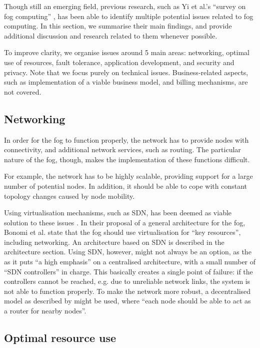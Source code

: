 \documentclass{article}
\begin{document}
Though still an emerging field, previous research, such as Yi et al.'s ``survey on fog computing'' \cite{yi2015survey}, has been able to identify multiple potential issues related to fog computing. In this section, we summarise their main findings, and provide additional discussion and research related to them whenever possible.

To improve clarity, we organise issues around 5 main areas: networking, optimal use of resources, fault tolerance, application development, and security and privacy. Note that we focus purely on technical issues. Business-related aspects, such as implementation of a viable business model, and billing mechanisms, are not covered.

\subsection{Networking}
In order for the fog to function properly, the network has to provide nodes with connectivity, and additional network services, such as routing. The particular nature of the fog, though, makes the implementation of these functions difficult. 

For example, the network has to be highly scalable, providing support for a large number of potential nodes. In addition, it should be able to cope with constant topology changes caused by node mobility.

Using virtualisation mechanisms, such as SDN, has been deemed as viable solution to these issues \cite{yi2015survey}. In their proposal of a general architecture for the fog, Bonomi et al. \cite{bonomi2014fog} state that the fog should use virtualisation for ``key resources'', including networking. An architecture based on SDN is described in the architecture section. Using SDN, however, might not always be an option, as the as it puts ``a high emphasis'' \cite{peng2016fog} on a centralised architecture, with a small number of ``SDN controllers'' in charge. This basically creates a single point of failure: if the controllers cannot be reached, e.g. due to unreliable network links, the system is not able to function properly. To make the network more robust, a decentralised model as described by \cite{yi2015survey} might be used, where  ``each node should be able to act as a router for nearby nodes''. 

\subsection{Optimal resource use}
\label{sub_opt_res_use}
\end{document}
